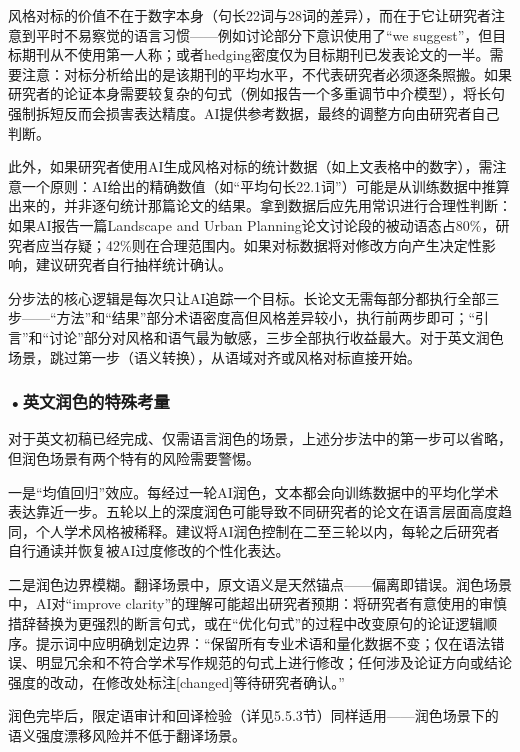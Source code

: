 \begin{critiquebox}
风格对标的价值不在于数字本身（句长22词与28词的差异），而在于它让研究者注意到平时不易察觉的语言习惯——例如讨论部分下意识使用了``we suggest''，但目标期刊从不使用第一人称；或者hedging密度仅为目标期刊已发表论文的一半。需要注意：对标分析给出的是该期刊的平均水平，不代表研究者必须逐条照搬。如果研究者的论证本身需要较复杂的句式（例如报告一个多重调节中介模型），将长句强制拆短反而会损害表达精度。AI提供参考数据，最终的调整方向由研究者自己判断。

此外，如果研究者使用AI生成风格对标的统计数据（如上文表格中的数字），需注意一个原则：AI给出的精确数值（如``平均句长22.1词''）可能是从训练数据中推算出来的，并非逐句统计那篇论文的结果。拿到数据后应先用常识进行合理性判断：如果AI报告一篇Landscape and Urban Planning论文讨论段的被动语态占80\%，研究者应当存疑；42\%则在合理范围内。如果对标数据将对修改方向产生决定性影响，建议研究者自行抽样统计确认。
\end{critiquebox}

分步法的核心逻辑是每次只让AI追踪一个目标。长论文无需每部分都执行全部三步——``方法''和``结果''部分术语密度高但风格差异较小，执行前两步即可；``引言''和``讨论''部分对风格和语气最为敏感，三步全部执行收益最大。对于英文润色场景，跳过第一步（语义转换），从语域对齐或风格对标直接开始。

\subsubsection*{\textbf{•英文润色的特殊考量}}

对于英文初稿已经完成、仅需语言润色的场景，上述分步法中的第一步可以省略，但润色场景有两个特有的风险需要警惕。

一是``均值回归''效应。每经过一轮AI润色，文本都会向训练数据中的平均化学术表达靠近一步。五轮以上的深度润色可能导致不同研究者的论文在语言层面高度趋同，个人学术风格被稀释。建议将AI润色控制在二至三轮以内，每轮之后研究者自行通读并恢复被AI过度修改的个性化表达。

二是润色边界模糊。翻译场景中，原文语义是天然锚点——偏离即错误。润色场景中，AI对``improve clarity''的理解可能超出研究者预期：将研究者有意使用的审慎措辞替换为更强烈的断言句式，或在``优化句式''的过程中改变原句的论证逻辑顺序。提示词中应明确划定边界：``保留所有专业术语和量化数据不变；仅在语法错误、明显冗余和不符合学术写作规范的句式上进行修改；任何涉及论证方向或结论强度的改动，在修改处标注[changed]等待研究者确认。''

润色完毕后，限定语审计和回译检验（详见5.5.3节）同样适用——润色场景下的语义强度漂移风险并不低于翻译场景。


